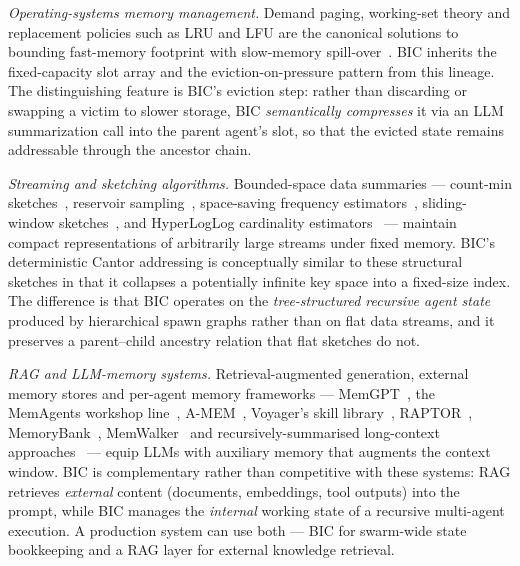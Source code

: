 \documentclass[fleqn,10pt]{article}
\theoremstyle{definition}
\begin{document}
\emph{Operating-systems memory management.} Demand paging, working-set
theory and replacement policies such as LRU and LFU are the canonical
solutions to bounding fast-memory footprint with slow-memory
spill-over~\citep{belady1966study, denning1970working,
tanenbaum2014modernos}. BIC inherits the fixed-capacity slot array
and the eviction-on-pressure pattern from this lineage. The
distinguishing feature is BIC's eviction step: rather than discarding
or swapping a victim to slower storage, BIC \emph{semantically
compresses} it via an LLM summarization call into the parent agent's
slot, so that the evicted state remains addressable through the
ancestor chain.

\emph{Streaming and sketching algorithms.} Bounded-space data
summaries --- count-min sketches~\citep{cormode2005cm}, reservoir
sampling~\citep{vitter1985reservoir}, space-saving frequency
estimators~\citep{metwally2005spacesaving}, sliding-window
sketches~\citep{datar2002sliding}, and HyperLogLog cardinality
estimators~\citep{flajolet2007hyperloglog} --- maintain compact
representations of arbitrarily large streams under fixed memory.
BIC's deterministic Cantor addressing is conceptually similar to
these structural sketches in that it collapses a potentially
infinite key space into a fixed-size index.
The difference is that BIC operates on the \emph{tree-structured
recursive agent state} produced by hierarchical spawn graphs rather
than on flat data streams, and it preserves a parent--child ancestry
relation that flat sketches do not.

\emph{RAG and LLM-memory systems.} Retrieval-augmented generation,
external memory stores and per-agent memory frameworks ---
MemGPT~\citep{packer2023memgpt}, the MemAgents
workshop line~\citep{memagents2026}, A-MEM~\citep{amem2025},
Voyager's skill library~\citep{wang2024voyager},
RAPTOR~\citep{raptor2024}, MemoryBank~\citep{zhong2024memorybank},
MemWalker~\citep{hu2024memwalker} and
recursively-summarised long-context approaches~\citep{wu2021recursively}
--- equip LLMs with auxiliary memory that augments the context
window. BIC is complementary rather than competitive with these
systems: RAG retrieves \emph{external} content (documents,
embeddings, tool outputs) into the prompt, while BIC manages the
\emph{internal} working state of a recursive multi-agent execution.
A production system can use both --- BIC for swarm-wide state
bookkeeping and a RAG layer for external knowledge retrieval.
\end{document}
